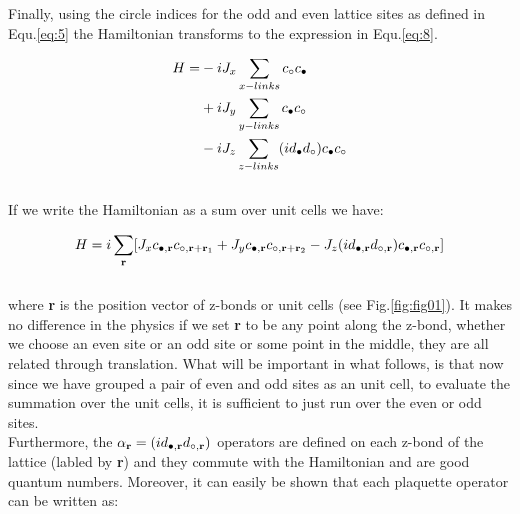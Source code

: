 \documentclass{article}
\begin{document}
\noindent Finally, using the circle indices for the odd and even lattice sites as defined in Equ.\hspace{0.2mm}\ref{eq:5} the Hamiltonian transforms to the expression in Equ.\hspace{0.2mm}\ref{eq:8}.

\begin{equation}\label{eq:8}
	\begin{aligned}
		H= &-iJ_x \sum_{x-links} c_{\circ}c_{\color{black}\bullet}\\
		&+iJ_y \sum_{y-links} c_{\color{black}\bullet}c_{\circ}\\
		&-iJ_z \sum_{z-links} (id_{\color{black}\bullet}d_{\circ})c_{\color{black}\bullet}c_{\circ}\\ 
	\end{aligned}
\end{equation}\\

\noindent If we write the Hamiltonian as a sum over unit cells we have:

\begin{equation}\label{eq:9}
	\begin{aligned}
		H= i\sum_{\textbf{r}}[J_x c_{\color{black}\bullet,\textbf{r}}c_{\circ,\textbf{r}+\textbf{r}_1} + J_y c_{\color{black}\bullet,\textbf{r}}c_{\circ,\textbf{r}+\textbf{r}_2} - J_z (id_{\color{black}\bullet,\textbf{r}}d_{\circ,\textbf{r}})c_{\color{black}\bullet,\textbf{r}}c_{\circ,\textbf{r}}]\\ 
	\end{aligned}
\end{equation}\\

\noindent where \textbf{r} is the position vector of z-bonds or unit cells  (see Fig.\hspace{0.2mm}\ref{fig:fig01}). It makes no difference in the physics if we set \textbf{r} to be any point along the z-bond, whether we choose an even site or an odd site or some point in the middle, they are all related through translation. 
What will be important in what follows, is that now since we have grouped a pair of even and odd sites as an unit cell, to evaluate the summation over the unit cells, it is sufficient to just run over the even or odd sites.\\
Furthermore, the $\alpha_\textbf{r} = (id_{\color{black}\bullet,\textbf{r}}d_{\circ,\textbf{r}})$ operators are defined on each z-bond of the lattice (labled by \textbf{r}) and they commute with the Hamiltonian and are good quantum numbers.
Moreover, it can easily be shown that each plaquette operator can be written as:
\end{document}
